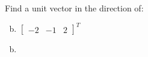 \documentclass[../main.tex]{subfiles}
\begin{document}
Find a unit vector in the direction of:
\begin{enumerate}[a)]
	\setcounter{enumi}{1}
	\item $\begin{bmatrix}-2&-1&2\end{bmatrix}^T$
\end{enumerate}

\solution
\begin{enumerate}[a)]
	\setcounter{enumi}{1}
	\item 
\end{enumerate}
\end{document}
